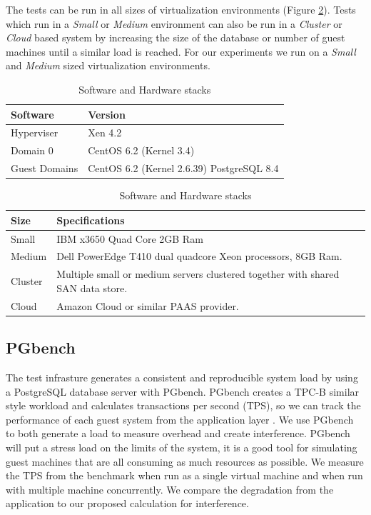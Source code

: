 \indent The tests can be run in all sizes of virtualization environments (Figure \ref{fig:virtSize}).  
Tests which run in a \emph{Small} or \emph{Medium} environment can also be run in a \emph{Cluster} or \emph{Cloud} based system by increasing the size of the database or number of guest machines until a similar load is reached.  
For our experiments we run on a \emph{Small} and \emph{Medium} sized virtualization environments. 

\begin{table}[h]
\begin{subtable}[h]{0.45\textwidth}
\begin{tabular}{ l p{5cm} }
  Software & Version \\
  \hline
  Hyperviser & Xen 4.2 \\
  Domain 0 & CentOS 6.2 (Kernel 3.4) \\
  Guest Domains & CentOS 6.2 (Kernel 2.6.39) PostgreSQL 8.4 \\
  \hline
\end{tabular}
\caption{Software installed virtualization test stack}
\label{fig:softStack}
\end{subtable}
\hfill
\begin{subtable}[h]{0.45\textwidth}
\begin{tabular}{ l p{5cm} }
  Size & Specifications \\
  \hline
  Small & IBM x3650 Quad Core 2GB Ram \\
  Medium & Dell PowerEdge T410 dual quadcore Xeon processors, 8GB Ram. \\
  Cluster & Multiple small or medium servers clustered together with shared SAN data store. \\
  Cloud & Amazon Cloud or similar PAAS provider. \\
  \hline
\end{tabular}
\caption{Virtualization sizes for tests}
\label{fig:virtSize}
\end{subtable}
\caption{Software and Hardware stacks}
\end{table}

\subsection{PGbench}
\indent The test infrasture generates a consistent and reproducible system load by using a PostgreSQL database server with PGbench. 
PGbench creates a TPC-B similar style workload and calculates transactions per second (TPS), so we can track the performance of each guest system from the application layer \cite{pgTune}.  
We use PGbench to both generate a load to measure overhead and create interference.
PGbench will put a stress load on the limits of the system, it is a good tool for simulating guest machines that are all consuming as much resources as possible.  
We measure the TPS from the benchmark when run as a single virtual machine and when run with multiple machine concurrently.  We compare the degradation from the application to our proposed calculation for interference.

